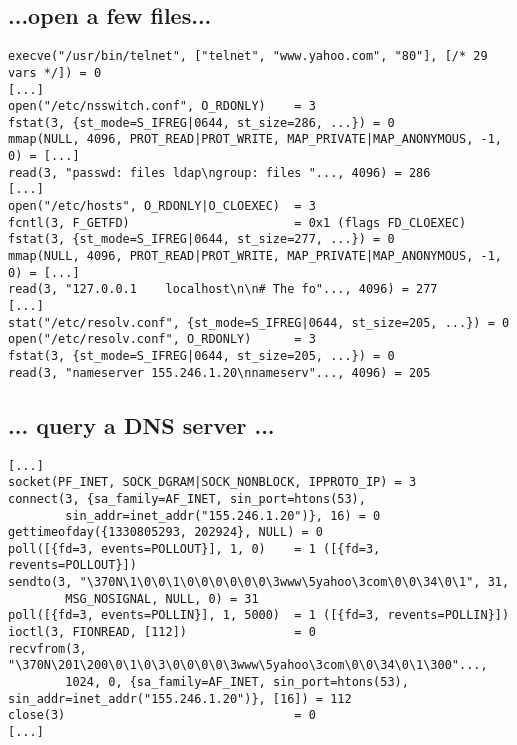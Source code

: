\documentclass[xga]{xdvislides}
\begin{document}
\subsection{...open a few files...}
\begin{verbatim}
execve("/usr/bin/telnet", ["telnet", "www.yahoo.com", "80"], [/* 29 vars */]) = 0
[...]
open("/etc/nsswitch.conf", O_RDONLY)    = 3
fstat(3, {st_mode=S_IFREG|0644, st_size=286, ...}) = 0
mmap(NULL, 4096, PROT_READ|PROT_WRITE, MAP_PRIVATE|MAP_ANONYMOUS, -1, 0) = [...]
read(3, "passwd: files ldap\ngroup: files "..., 4096) = 286
[...]
open("/etc/hosts", O_RDONLY|O_CLOEXEC)  = 3
fcntl(3, F_GETFD)                       = 0x1 (flags FD_CLOEXEC)
fstat(3, {st_mode=S_IFREG|0644, st_size=277, ...}) = 0
mmap(NULL, 4096, PROT_READ|PROT_WRITE, MAP_PRIVATE|MAP_ANONYMOUS, -1, 0) = [...]
read(3, "127.0.0.1    localhost\n\n# The fo"..., 4096) = 277
[...]
stat("/etc/resolv.conf", {st_mode=S_IFREG|0644, st_size=205, ...}) = 0
open("/etc/resolv.conf", O_RDONLY)      = 3
fstat(3, {st_mode=S_IFREG|0644, st_size=205, ...}) = 0
read(3, "nameserver 155.246.1.20\nnameserv"..., 4096) = 205
\end{verbatim}

\subsection{... query a DNS server ...}
\begin{verbatim}
[...]
socket(PF_INET, SOCK_DGRAM|SOCK_NONBLOCK, IPPROTO_IP) = 3
connect(3, {sa_family=AF_INET, sin_port=htons(53),
        sin_addr=inet_addr("155.246.1.20")}, 16) = 0
gettimeofday({1330805293, 202924}, NULL) = 0
poll([{fd=3, events=POLLOUT}], 1, 0)    = 1 ([{fd=3, revents=POLLOUT}])
sendto(3, "\370N\1\0\0\1\0\0\0\0\0\0\3www\5yahoo\3com\0\0\34\0\1", 31,
        MSG_NOSIGNAL, NULL, 0) = 31
poll([{fd=3, events=POLLIN}], 1, 5000)  = 1 ([{fd=3, revents=POLLIN}])
ioctl(3, FIONREAD, [112])               = 0
recvfrom(3, "\370N\201\200\0\1\0\3\0\0\0\0\3www\5yahoo\3com\0\0\34\0\1\300"...,
        1024, 0, {sa_family=AF_INET, sin_port=htons(53),
sin_addr=inet_addr("155.246.1.20")}, [16]) = 112
close(3)                                = 0
[...]
\end{verbatim}
\end{document}
